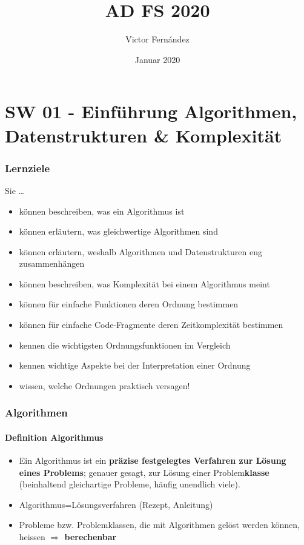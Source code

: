 \documentclass[10pt,a4paper]{article}
\title{AD FS 2020}
\author{Victor Fernández}
\date{Januar 2020}
\begin{document}
\maketitle
\tableofcontents
\thispagestyle{empty}
\pagebreak
\part{SW 01 - Einführung Algorithmen, Datenstrukturen \& Komplexität}
\section{Lernziele}
Sie \dots
\begin{itemize}[noitemsep,topsep=0pt,leftmargin=*]
    \item können beschreiben, was ein Algorithmus ist
    \item können erläutern, was gleichwertige Algorithmen sind
    \item können erläutern, weshalb Algorithmen und Datenstrukturen eng zusammenhängen
    \item können beschreiben, was Komplexität bei einem Algorithmus meint
    \item können für einfache Funktionen deren Ordnung bestimmen
    \item können für einfache Code-Fragmente deren Zeitkomplexität bestimmen
    \item kennen die wichtigsten Ordnungsfunktionen im Vergleich
    \item kennen wichtige Aspekte bei der Interpretation einer Ordnung
    \item wissen, welche Ordnungen praktisch versagen!
\end{itemize}

\section{Algorithmen}
\subsection{Definition Algorithmus}
\begin{itemize}[noitemsep,topsep=0pt,leftmargin=*]
    \item Ein Algorithmus ist ein \textbf{präzise festgelegtes Verfahren zur Lösung eines Problems}; genauer gesagt, zur Lösung einer Problem\textbf{klasse} (beinhaltend gleichartige Probleme, häufig unendlich viele).
    \item Algorithmus=Lösungsverfahren (Rezept, Anleitung)
    \item Probleme bzw. Problemklassen, die mit Algorithmen gelöst werden können, heissen \textbf{$\Rightarrow$ berechenbar}
\end{itemize}
\end{document}
